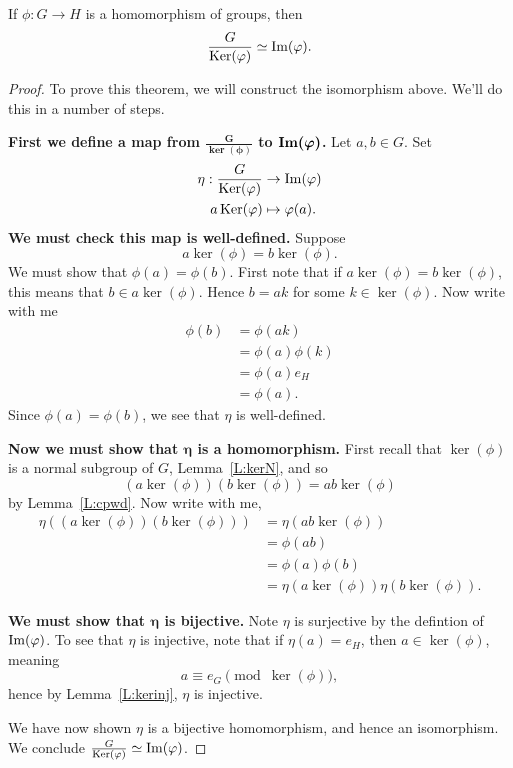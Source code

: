 \documentclass{ximera}
\begin{document}
\begin{theorem}\label{T:NI}
  If $\phi:G\to H$ is a homomorphism of groups, then
  \[
  \frac{G}{\mathop{\mathrm{Ker}}\nolimits(\varphi)} \simeq \operatorname{Im}(\varphi).
  \]
  \begin{proof}
    To prove this theorem, we will construct the isomorphism
    above. We'll do this in a number of steps.


    \textbf{First we define a map from
      $\boldsymbol{\frac{G}{\ker(\phi)}}$ to
      $\boldsymbol{\operatorname{Im}(\varphi)}$.}  Let $a,b\in G$. Set
    \begin{align*}
      \eta: \frac{G}{\mathop{\mathrm{Ker}}\nolimits(\varphi)} &\to \operatorname{Im}(\varphi)\\
      a\mathop{\mathrm{Ker}}\nolimits(\varphi) &\mapsto \varphi(a).
    \end{align*}
    \textbf{We must check this map is
      well-defined.} Suppose
    \[
    a \ker(\phi) = b\ker(\phi).
    \]
    We must show that $\phi(a) = \phi(b)$. First note that if $a
    \ker(\phi) = b\ker(\phi)$, this means that $b\in
    a\ker(\phi)$. Hence $b = ak$ for some $k\in\ker(\phi)$. Now write
    with me
    \begin{align*}
      \phi(b) &=\phi(ak)\\
      &=\phi(a)\phi(k)\\
      &=\phi(a) e_H\\
      &=\phi(a).
    \end{align*}
    Since $\phi(a) = \phi(b)$, we see that $\eta$ is well-defined.


    
    \textbf{Now we must show that $\boldsymbol\eta$ is a
      homomorphism.} First recall that $\ker(\phi)$ is a normal
    subgroup of $G$, Lemma~\ref{L:kerN}, and so
    \[
    (a\ker(\phi)) (b\ker(\phi))  =  ab\ker(\phi)
    \]
    by Lemma~\ref{L:cpwd}.  Now write with me,
    \begin{align*}
    \eta\left((a\ker(\phi))( b\ker(\phi))\right) &= \eta(ab\ker(\phi))\\
    &= \phi(ab)\\
    &= \phi(a)\phi(b)\\
    &= \eta(a\ker(\phi)) \eta(b\ker(\phi)).
    \end{align*}



    \textbf{We must show that $\boldsymbol\eta$ is bijective.} Note
    $\eta$ is surjective by the defintion of $\operatorname{Im}(\varphi)$.  To see that
    $\eta$ is injective, note that if $\eta(a) = e_H$, then $a\in
    \ker(\phi)$, meaning
    \[
    a\equiv e_G \pmod{\ker(\phi)},
    \]
    hence by Lemma~\ref{L:kerinj}, $\eta$ is injective.

    We have now shown $\eta$ is a bijective homomorphism, and hence an
    isomorphism. We conclude $\frac{G}{\mathop{\mathrm{Ker}}\nolimits(\varphi)} \simeq \operatorname{Im}(\varphi)$.
  \end{proof}
\end{theorem}
\end{document}
